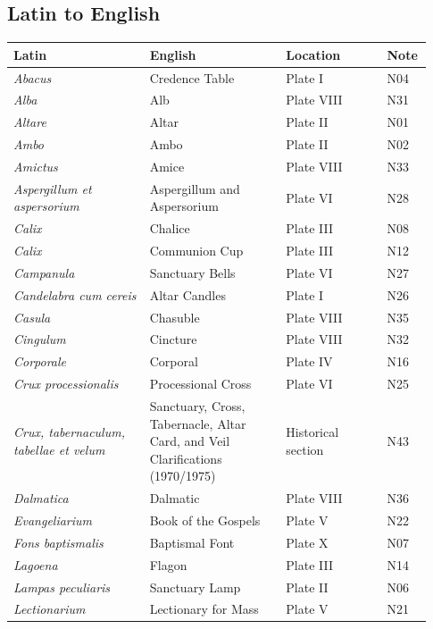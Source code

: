 \subsection*{Latin to English}
{\footnotesize\begin{longtable}{>{\raggedright\arraybackslash}p{0.31\linewidth}>{\raggedright\arraybackslash}p{0.31\linewidth}>{\raggedright\arraybackslash}p{0.23\linewidth}>{\raggedright\arraybackslash}p{0.08\linewidth}}
\toprule
\textbf{Latin} & \textbf{English} & \textbf{Location} & \textbf{Note} \\
\midrule
\endhead
\textit{Abacus} & Credence Table & Plate I & N04 \\
\textit{Alba} & Alb & Plate VIII & N31 \\
\textit{Altare} & Altar & Plate II & N01 \\
\textit{Ambo} & Ambo & Plate II & N02 \\
\textit{Amictus} & Amice & Plate VIII & N33 \\
\textit{Aspergillum et aspersorium} & Aspergillum and Aspersorium & Plate VI & N28 \\
\textit{Calix} & Chalice & Plate III & N08 \\
\textit{Calix} & Communion Cup & Plate III & N12 \\
\textit{Campanula} & Sanctuary Bells & Plate VI & N27 \\
\textit{Candelabra cum cereis} & Altar Candles & Plate I & N26 \\
\textit{Casula} & Chasuble & Plate VIII & N35 \\
\textit{Cingulum} & Cincture & Plate VIII & N32 \\
\textit{Corporale} & Corporal & Plate IV & N16 \\
\textit{Crux processionalis} & Processional Cross & Plate VI & N25 \\
\textit{Crux, tabernaculum, tabellae et velum} & Sanctuary, Cross, Tabernacle, Altar Card, and Veil Clarifications (1970/1975) & Historical section & N43 \\
\textit{Dalmatica} & Dalmatic & Plate VIII & N36 \\
\textit{Evangeliarium} & Book of the Gospels & Plate V & N22 \\
\textit{Fons baptismalis} & Baptismal Font & Plate X & N07 \\
\textit{Lagoena} & Flagon & Plate III & N14 \\
\textit{Lampas peculiaris} & Sanctuary Lamp & Plate II & N06 \\
\textit{Lectionarium} & Lectionary for Mass & Plate V & N21 \\

\end{longtable}}
